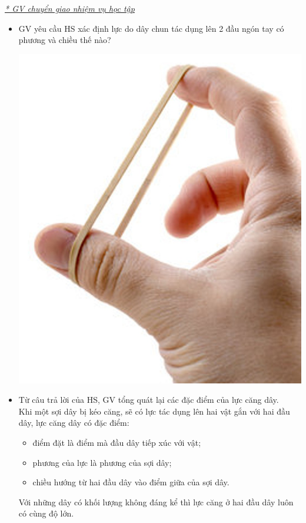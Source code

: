 {\textit{\underline{* GV chuyển giao nhiệm vụ học tập}}
	\begin{itemize}[label=-]
		\item GV yêu cầu HS xác định lực do dây chun tác dụng lên 2 đầu ngón tay có phương và chiều thế nào?
		\begin{center}
			\includegraphics[scale=0.4]{figs/G10-BAI11-10}
		\end{center}
		\item Từ câu trả lời của HS, GV tổng quát lại các đặc điểm của lực căng dây.\\
		Khi một sợi dây bị kéo căng, sẽ có lực tác dụng lên hai vật gắn với hai đầu dây, lực căng dây có đặc điểm:
		\begin{itemize}[label=$\bullet$]
			\item điểm đặt là điểm mà đầu dây tiếp xúc với vật;
			\item phương của lực là phương của sợi dây;
			\item chiều hướng từ hai đầu dây vào điểm giữa của sợi dây.
		\end{itemize}
		Với những dây có khối lượng không đáng kể thì lực căng ở hai đầu dây luôn có cùng độ lớn.

\end{itemize}}
